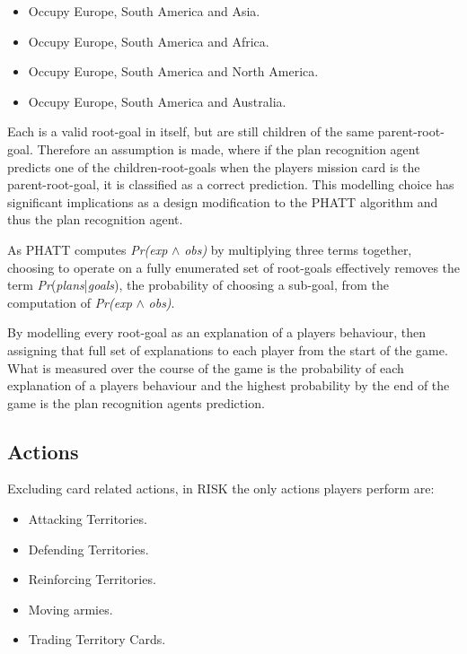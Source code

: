 \documentclass[parskip]{cs4rep}
\begin{document}
\begin{itemize}
\item
Occupy Europe, South America and Asia.
\item
Occupy Europe, South America and Africa.
\item
Occupy Europe, South America and North America.
\item
Occupy Europe, South America and Australia.\newline
\end{itemize}

Each is a valid root-goal in itself, but are still children of the same parent-root-goal. Therefore an assumption is made, where if the plan recognition agent predicts one of the children-root-goals when the players mission card is the parent-root-goal, it is classified as a correct prediction. This modelling choice has significant implications as a design modification to the PHATT algorithm and thus the plan recognition agent.

As PHATT computes \textit{Pr(exp} $\wedge$ \textit{obs)} by multiplying three terms together, choosing to operate on a fully enumerated set of root-goals effectively removes the term \textit{Pr}(\textit{plans}|\textit{goals}), the probability of choosing a sub-goal, from the computation of \textit{Pr(exp} $\wedge$ \textit{obs)}.

By modelling every root-goal as an explanation of a players behaviour, then assigning that full set of explanations to each player from the start of the game. What is measured over the course of the game is the probability of each explanation of a players behaviour and the highest probability by the end of the game is the plan recognition agents prediction.

\subsection{Actions}

Excluding card related actions, in RISK the only actions players perform are:

\begin{itemize}
\item
Attacking Territories.
\item
Defending Territories.
\item
Reinforcing Territories.
\item
Moving armies.
\item
Trading Territory Cards.
\end{itemize}
\end{document}
